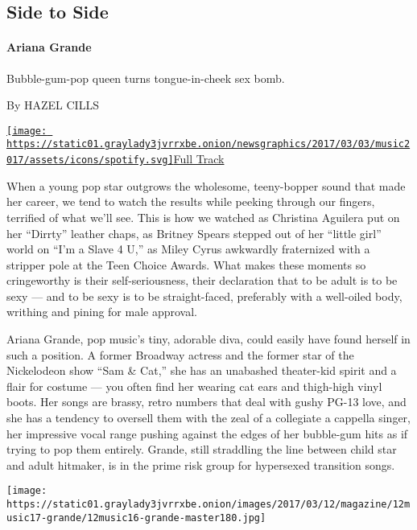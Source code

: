 \hypertarget{--side-to-side}{%
\subsection{\texorpdfstring{ Side to
Side}{  Side to Side}}\label{--side-to-side}}

\hypertarget{ariana-grande}{%
\paragraph{Ariana Grande}\label{ariana-grande}}

Bubble-gum-pop queen turns tongue-in-cheek sex bomb.

By HAZEL CILLS

\href{https://open.spotify.com/track/1pKeFVVUOPjFsOABub0OaV}{\texttt{[image: https://static01.graylady3jvrrxbe.onion/newsgraphics/2017/03/03/music2017/assets/icons/spotify.svg]}Full
Track}

When a young pop star outgrows the wholesome, teeny-bopper sound that
made her career, we tend to watch the results while peeking through our
fingers, terrified of what we'll see. This is how we watched as
Christina Aguilera put on her ``Dirrty'' leather chaps, as Britney
Spears stepped out of her ``little girl'' world on ``I'm a Slave 4 U,''
as Miley Cyrus awkwardly fraternized with a stripper pole at the Teen
Choice Awards. What makes these moments so cringeworthy is their
self-seriousness, their declaration that to be adult is to be sexy ---
and to be sexy is to be straight-faced, preferably with a well-oiled
body, writhing and pining for male approval.

Ariana Grande, pop music's tiny, adorable diva, could easily have found
herself in such a position. A former Broadway actress and the former
star of the Nickelodeon show ``Sam \& Cat,'' she has an unabashed
theater-kid spirit and a flair for costume --- you often find her
wearing cat ears and thigh-high vinyl boots. Her songs are brassy, retro
numbers that deal with gushy PG-13 love, and she has a tendency to
oversell them with the zeal of a collegiate a cappella singer, her
impressive vocal range pushing against the edges of her bubble-gum hits
as if trying to pop them entirely. Grande, still straddling the line
between child star and adult hitmaker, is in the prime risk group for
hypersexed transition songs.

\texttt{[image: https://static01.graylady3jvrrxbe.onion/images/2017/03/12/magazine/12music17-grande/12music16-grande-master180.jpg]}

